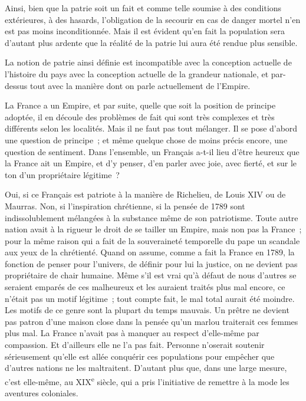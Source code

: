 \documentclass[french,twoside]{book} %
\begin{document}
Ainsi, bien que la patrie soit un fait et comme telle soumise à des conditions extérieures, à des hasards, l'obligation de la secourir en cas de danger mortel n'en est pas moins inconditionnée. Mais il est évident qu'en fait la population sera d'autant plus ardente que la réalité de la patrie lui aura été rendue plus sensible.\par
La notion de patrie ainsi définie est incompatible avec la conception actuelle de l'histoire du pays avec la conception actuelle de la grandeur nationale, et par-dessus tout avec la manière dont on parle actuellement de l'Empire.\par
La France a un Empire, et par suite, quelle que soit la position de principe adoptée, il en découle des problèmes de fait qui sont très complexes et très différents selon les localités. Mais il ne faut pas tout mélanger. Il se pose d'abord une question de principe ; et même quelque chose de moins précis encore, une question de sentiment. Dans l'ensemble, un Français a-t-il lieu d'être heureux que la France ait un Empire, et d'y penser, d'en parler avec joie, avec fierté, et sur le ton d'un propriétaire légitime ?\par
Oui, si ce Français est patriote à la manière de Richelieu, de Louis XIV ou de Maurras. Non, si l'inspiration chrétienne, si la pensée de 1789 sont indissolublement mélangées à la substance même de son patriotisme. Toute autre nation avait à la rigueur le droit de se tailler un Empire, mais non pas la France ; pour la même raison qui a fait de la souveraineté temporelle du pape un scandale aux yeux de la chrétienté. Quand on assume, comme a fait la France en 1789, la fonction de penser pour l'univers, de définir pour lui la justice, on ne devient pas propriétaire de chair humaine. Même s'il est vrai qu'à défaut de nous d'autres se seraient emparés de ces malheureux et les auraient traités plus mal encore, ce n'était pas un motif légitime ; tout compte fait, le mal total aurait été moindre. Les motifs de ce genre sont la plupart du temps mauvais. Un prêtre ne devient pas patron d'une maison close dans la pensée qu'un marlou traiterait ces femmes plus mal. La France n'avait pas à manquer au respect d'elle-même par compassion. Et d'ailleurs elle ne l'a pas fait. Personne n'oserait soutenir sérieusement qu'elle est allée conquérir ces populations pour empêcher que d'autres nations ne les maltraitent. D'autant plus que, dans une large mesure, c'est elle-même, au XIX\textsuperscript{e} siècle, qui a pris l'initiative de remettre à la mode les aventures coloniales.\par
\end{document}

